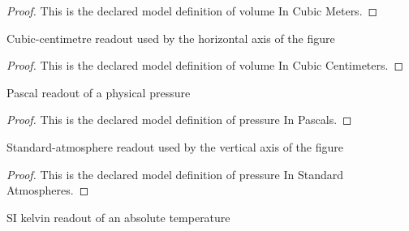 \begin{proof}
  This is the declared model definition of volume In Cubic Meters.
\end{proof}
\begin{definition}
  \label{def:physics:phyx-mini-0412:phyxminiproblems-problemphyxmini0412-volumeincubiccentimeters}
  Cubic-centimetre readout used by the horizontal axis of the figure
\end{definition}
\begin{proof}
  This is the declared model definition of volume In Cubic Centimeters.
\end{proof}
\begin{definition}
  \label{def:physics:phyx-mini-0412:phyxminiproblems-problemphyxmini0412-pressureinpascals}
  Pascal readout of a physical pressure
\end{definition}
\begin{proof}
  This is the declared model definition of pressure In Pascals.
\end{proof}
\begin{definition}
  \label{def:physics:phyx-mini-0412:phyxminiproblems-problemphyxmini0412-pressureinstandardatmospheres}
  Standard-atmosphere readout used by the vertical axis of the figure
\end{definition}
\begin{proof}
  This is the declared model definition of pressure In Standard Atmospheres.
\end{proof}
\begin{definition}
  \label{def:physics:phyx-mini-0412:phyxminiproblems-problemphyxmini0412-temperatureinkelvins}
  SI kelvin readout of an absolute temperature
\end{definition}
